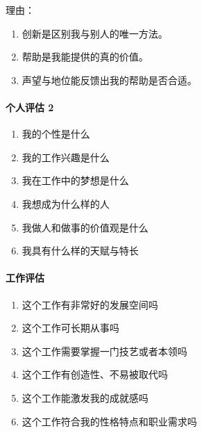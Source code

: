 \documentclass[letterpaper,11pt,english]{sphinxmanual}
\begin{document}
理由：
\begin{enumerate}
%
\item {} 
创新是区别我与别人的唯一方法。

\item {} 
帮助是我能提供的真的价值。

\item {} 
声望与地位能反馈出我的帮助是否合适。

\end{enumerate}


\paragraph{个人评估 2\sphinxfootnotemark[756]}
\label{\detokenize{chapter_interview/choose:id3}}%
\begin{footnotetext}[756]\sphinxAtStartFootnote
{}
%
\end{footnotetext}\ignorespaces \begin{enumerate}
%
\item {} 
我的个性是什么

\item {} 
我的工作兴趣是什么

\item {} 
我在工作中的梦想是什么

\item {} 
我想成为什么样的人

\item {} 
我做人和做事的价值观是什么

\item {} 
我具有什么样的天赋与特长

\end{enumerate}


\paragraph{工作评估}
\label{\detokenize{chapter_interview/choose:id4}}\begin{enumerate}
%
\item {} 
这个工作有非常好的发展空间吗

\item {} 
这个工作可长期从事吗

\item {} 
这个工作需要掌握一门技艺或者本领吗

\item {} 
这个工作有创造性、不易被取代吗

\item {} 
这个工作能激发我的成就感吗

\item {} 
这个工作符合我的性格特点和职业需求吗

\end{enumerate}
\end{document}
